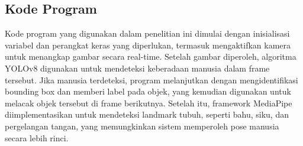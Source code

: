 \subsection{Kode Program}
\label{subsec:kode_program}

Kode program yang digunakan dalam penelitian ini dimulai dengan inisialisasi variabel dan perangkat keras yang diperlukan, termasuk mengaktifkan kamera untuk menangkap gambar secara real-time. Setelah gambar diperoleh, algoritma YOLOv8 digunakan untuk mendeteksi keberadaan manusia dalam frame tersebut. Jika manusia terdeteksi, program melanjutkan dengan mengidentifikasi bounding box dan memberi label pada objek, yang kemudian digunakan untuk melacak objek tersebut di frame berikutnya. Setelah itu, framework MediaPipe diimplementasikan untuk mendeteksi landmark tubuh, seperti bahu, siku, dan pergelangan tangan, yang memungkinkan sistem memperoleh pose manusia secara lebih rinci.

